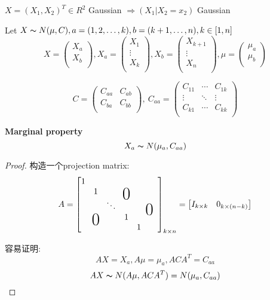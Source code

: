 \documentclass{article}
\begin{document}
\begin{theorem}
$X = (X_1, X_2)^T \in R^2$ Gaussian $\Rightarrow (X_1 | X_2 = x_2)$ Gaussian
\end{theorem}

\bigskip
Let $X \thicksim{N}(\mu, C), a = (1,2,\ldots, k), b = (k+1, \ldots, n), k \in [1,n]$\\
$$
X =
\begin{pmatrix}
    X_a \\
    X_b \\
\end{pmatrix}
,
X_a =
\begin{pmatrix}
    X_1 \\
    \vdots \\
    X_k \\
\end{pmatrix}
,
X_b =
\begin{pmatrix}
  X_{k+1} \\
  \vdots \\
  X_n \\
\end{pmatrix}
,
\mu =
\begin{pmatrix}
  \mu_a \\
  \mu_b \\
\end{pmatrix}
$$

$$
C =
\begin{pmatrix}
  C_{aa} & C_{ab} \\
  C_{ba} & C_{bb} \\
\end{pmatrix}
,
\
C_{aa} =
\begin{pmatrix}
  C_{11} & \cdots & C_{1k} \\
  \vdots & \ddots & \vdots \\
  C_{k1} & \cdots & C_{kk} \\
\end{pmatrix}
$$
\begin{fact}
\textbf{Marginal property}\\
$$X_a \thicksim{N}(\mu_a, C_{aa})$$
\end{fact}
\begin{proof}
构造一个projection matrix:
\newcommand\bigzero{\makebox(0,0){\text{\huge0}}}
$$
A =
\begin{bmatrix}
    1 &  &  &  &  &&\\
 	  & 1 &  & \bigzero & &&\\
      &   & \ddots &  &  &\bigzero& \\
      & \bigzero & & 1 &  &&\\
      &   &   & & 1 &&\\
\end{bmatrix}_{k \times n}
=
\begin{bmatrix}
	I_{k \times k} & 0_{k \times (n-k)}
\end{bmatrix}
$$

容易证明: $$AX = {X_a}, A\mu = \mu_a, ACA^T = C_{aa}$$
$$AX \thicksim{N}(A\mu, ACA^T) = N(\mu_a, C_{aa})$$
\end{proof}
\end{document}
